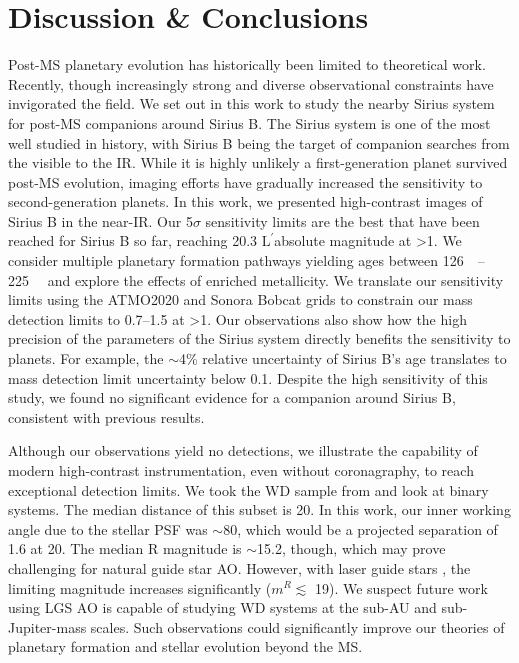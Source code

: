 \documentclass[twocolumn]{aastex631}
\newcommand\Lp{$\mathrm{L}^\prime$}
\begin{document}
\section{Discussion \& Conclusions} \label{sec:conclusion}

Post-MS planetary evolution has historically been limited to theoretical work. Recently, though increasingly strong and diverse observational constraints have invigorated the field. We set out in this work to study the nearby Sirius system for post-MS companions around Sirius B. The Sirius system is one of the most well studied in history, with Sirius B being the target of companion searches from the visible to the IR. While it is highly unlikely a first-generation planet survived post-MS evolution, imaging efforts have gradually increased the sensitivity to second-generation planets. In this work, we presented high-contrast images of Sirius B in the near-IR. Our 5$\sigma$ sensitivity limits are the best that have been reached for Sirius B so far, reaching \num{20.3} \Lp absolute magnitude at \textgreater\qty{1}{\au}. We consider multiple planetary formation pathways yielding ages between \qtyrange{126}{225}{\mega\year} and explore the effects of enriched metallicity. We translate our sensitivity limits using the ATMO2020 and Sonora Bobcat grids to constrain our mass detection limits to \qtyrange{0.7}{1.5}{\jupitermass} at \textgreater\qty{1}{\au}. Our observations also show how the high precision of the parameters of the Sirius system directly benefits the sensitivity to planets. For example, the $\sim$4\% relative uncertainty of Sirius B's age translates to mass detection limit uncertainty below \qty{0.1}{\jupitermass}. Despite the high sensitivity of this study, we found no significant evidence for a companion around Sirius B, consistent with previous results.

Although our observations yield no detections, we illustrate the capability of modern high-contrast instrumentation, even without coronagraphy, to reach exceptional detection limits. We took the WD sample from \citet{holberg25ParsecLocal2016} and look at binary systems. The median distance of this subset is \qty{20}{\parsec}. In this work, our inner working angle due to the stellar PSF was $\sim$\qty{80}{\milliarcsecond}, which would be a projected separation of \qty{1.6}{\au} at \qty{20}{\parsec}. The median R magnitude is $\sim$\num{15.2}, though, which may prove challenging for natural guide star AO. However, with laser guide stars \citep[LGS; e.g.,][]{vandamKeckObservatoryLaser2006,baranecRoboAO2FacilityRapid2018}, the limiting magnitude increases significantly ($m^R\lesssim$ \num{19}). We suspect future work using LGS AO is capable of studying WD systems at the sub-AU and sub-Jupiter-mass scales. Such observations could significantly improve our theories of planetary formation and stellar evolution beyond the MS.
\end{document}
